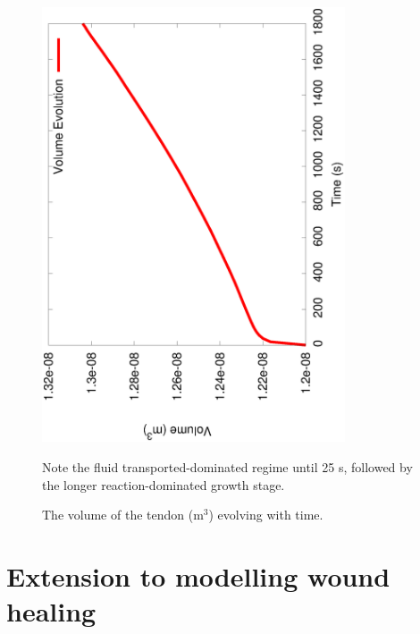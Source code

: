 \begin{figure}[!hpt]
  \begin{center}
    \includegraphics[angle=270,width=0.8\textwidth]{images/examples/lagrangian/swelling/volume-evolution-3}
    \caption{The volume of the tendon (m$^3$) evolving with
      time.}
    \label{volume_evolution}
  \end{center}
  {Note the fluid transported-dominated regime until 25 s,
    followed by the longer reaction-dominated growth stage.}
\end{figure}




\section{Extension to modelling wound healing}
\label{wound-healing-example}

